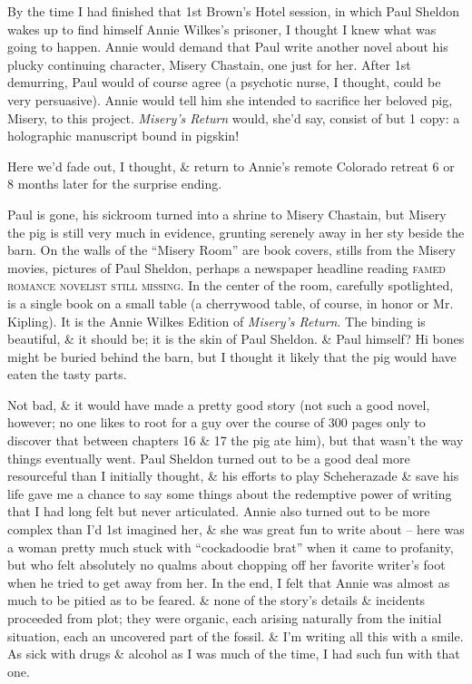 \documentclass{article}
\numberwithin{equation}{section}
\begin{document}
By the time I had finished that 1st Brown's Hotel session, in which Paul Sheldon wakes up to find himself Annie Wilkes's prisoner, I thought I knew what was going to happen. Annie would demand that Paul write another novel about his plucky continuing character, Misery Chastain, one just for her. After 1st demurring, Paul would of course agree (a psychotic nurse, I thought, could be very persuasive). Annie would tell him she intended to sacrifice her beloved pig, Misery, to this project. \textit{Misery's Return} would, she'd say, consist of but 1 copy: a holographic manuscript bound in pigskin!

Here we'd fade out, I thought, \& return to Annie's remote Colorado retreat 6 or 8 months later for the surprise ending.

Paul is gone, his sickroom turned into a shrine to Misery Chastain, but Misery the pig is still very much in evidence, grunting serenely away in her sty beside the barn. On the walls of the ``Misery Room'' are book covers, stills from the Misery movies, pictures of Paul Sheldon, perhaps a newspaper headline reading \textsc{famed romance novelist still missing}. In the center of the room, carefully spotlighted, is a single book on a small table (a cherrywood table, of course, in honor or Mr. Kipling). It is the Annie Wilkes Edition of \textit{Misery's Return}. The binding is beautiful, \& it should be; it is the skin of Paul Sheldon. \& Paul himself? Hi bones might be buried behind the barn, but I thought it likely that the pig would have eaten the tasty parts.

Not bad, \& it would have made a pretty good story (not such a good novel, however; no one likes to root for a guy over the course of 300 pages only to discover that between chapters 16 \& 17 the pig ate him), but that wasn't the way things eventually went. Paul Sheldon turned out to be a good deal more resourceful than I initially thought, \& his efforts to play Scheherazade \& save his life gave me a chance to say some things about the redemptive power of writing that I had long felt but never articulated. Annie also turned out to be more complex than I'd 1st imagined her, \& she was great fun to write about -- here was a woman pretty much stuck with ``cockadoodie brat'' when it came to profanity, but who felt absolutely no qualms about chopping off her favorite writer's foot when he tried to get away from her. In the end, I felt that Annie was almost as much to be pitied as to be feared. \& none of the story's details \& incidents proceeded from plot; they were organic, each arising naturally from the initial situation, each an uncovered part of the fossil. \& I'm writing all this with a smile. As sick with drugs \& alcohol as I was much of the time, I had such fun with that one.
\end{document}
